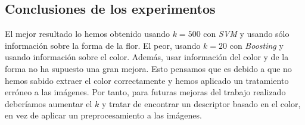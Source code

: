 \documentclass[paper=a4, fontsize=11pt]{article} %
\numberwithin{equation}{section} %
\numberwithin{figure}{section} %
\numberwithin{table}{section} %
\begin{document}
\subsection{Conclusiones de los experimentos}
El mejor resultado lo hemos obtenido usando $k=500$ con \textit{SVM} y usando sólo información sobre la forma de la flor. El peor, usando $k=20$ con \textit{Boosting} y usando información sobre el color. Además, usar información del color y de la forma no ha supuesto una gran mejora. Esto pensamos que es debido a que no hemos sabido extraer el color correctamente y hemos aplicado un tratamiento erróneo a las imágenes. Por tanto, para futuras mejoras del trabajo realizado deberíamos aumentar el $k$ y tratar de encontrar un descriptor basado en el color, en vez de aplicar un preprocesamiento a las imágenes.

\end{document}
